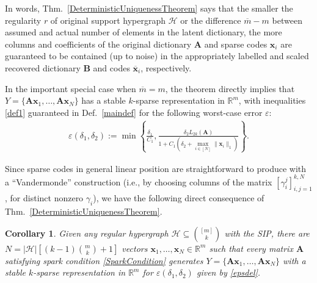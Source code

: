 \documentclass[journal, twocolumn]{IEEEtran}
\newtheorem{corollary}{Corollary}
\begin{document}
In words, Thm.~\ref{DeterministicUniquenessTheorem} says that the smaller the regularity $r$ of original support hypergraph $\mathcal{H}$ or the difference $\overline m - m$ between assumed and actual number of elements in the latent dictionary, the more columns and coefficients of the original dictionary $\mathbf{A}$ and sparse codes $\mathbf{x}_i$ are guaranteed to be contained (up to noise) in the appropriately labelled and scaled recovered dictionary $\mathbf{B}$ and codes $\mathbf{\overline x}_i$, respectively. 

In the important special case when $\overline m = m$, the theorem directly implies that  $Y = \{\mathbf{Ax}_1, \ldots, \mathbf{Ax}_N\}$ has a stable $k$-sparse representation in $\mathbb{R}^m$, with inequalities \eqref{def1} guaranteed in Def.~\ref{maindef} for the following worst-case error $\varepsilon$: 
\begin{align}\label{epsdel}
\varepsilon(\delta_1, \delta_2) := \min \left\{ \frac{\delta_1}{ C_1 }, \frac{ \delta_2 L_{2k}(\mathbf{A})}{ 1 + C_1 \left( \delta_2 + \max_{i \in [N]} \|\mathbf{x}_i\|_1  \right) } \right\}.
\end{align}

Since sparse codes in general linear position are straightforward to produce with a ``Vandermonde''  construction (i.e., by choosing columns of the matrix $[\gamma_{i}^j]_{i,j=1}^{k,N}$, for distinct nonzero $\gamma_i$), we have the following direct consequence of Thm.~\ref{DeterministicUniquenessTheorem}.

\begin{corollary}\label{DeterministicUniquenessCorollary}
Given any regular hypergraph $\mathcal{H} \subseteq {[m] \choose k}$ with the SIP, there are $N =  |\mathcal{H}| \left[ (k-1){m \choose k} + 1  \right]$ vectors \mbox{$\mathbf{x}_1, \ldots, \mathbf{x}_N \in \mathbb{R}^m$} such that every matrix $\mathbf{A}$ satisfying spark condition \eqref{SparkCondition} generates $Y = \{\mathbf{A}\mathbf{x}_1, \ldots, \mathbf{A}\mathbf{x}_N\}$ with a stable $k$-sparse representation in $\mathbb{R}^m$ for $\varepsilon(\delta_1,\delta_2)$ given by \eqref{epsdel}.
\end{corollary}
\end{document}
